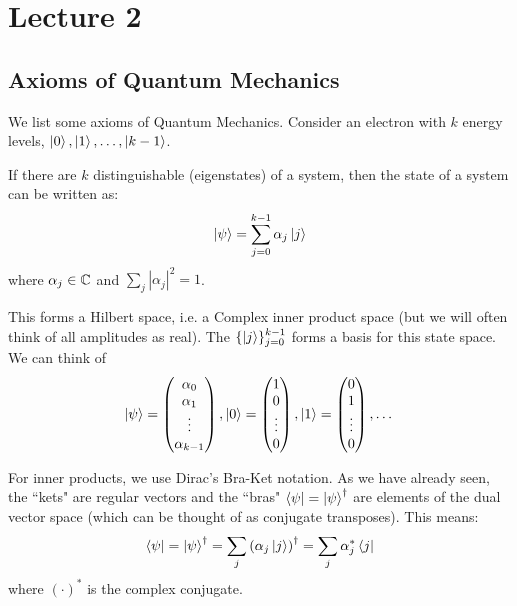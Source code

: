 
\section{Lecture 2}

\subsection{Axioms of Quantum Mechanics}

We list some axioms of Quantum Mechanics. Consider an electron with $k$ energy levels, $\ket{0}, \ket{1}, \dots, \ket{k - 1}$.

\begin{note}
    If there are $k$ distinguishable (eigenstates) of a system, then the state of a system can be written as:
    \[ \ket{\psi} = \sum_{j = 0}^{k - 1} \alpha_j \ket{j} \]
    where $\alpha_j \in \operatorname{\mathbb{C}}$ and $\sum_{j} |\alpha_j|^2 = 1$.
\end{note}

This forms a Hilbert space, i.e. a Complex inner product space (but we will often think of all amplitudes as real). The $\{ \ket{j} \}_{j = 0}^{k - 1}$ forms
a basis for this state space. We can think of
    \[ \ket{\psi} = \begin{pmatrix}
        \alpha_0 \\ \alpha_1 \\ \vdots \\ \alpha_{k - 1}
    \end{pmatrix}, \ket{0} = \begin{pmatrix}
        1 \\ 0 \\ \vdots \\ 0
    \end{pmatrix}, \ket{1} = \begin{pmatrix}
        0 \\ 1 \\ \vdots \\ 0
    \end{pmatrix}, \dots \]

For inner products, we use Dirac's Bra-Ket notation. As we have already seen, the ``kets" are regular vectors and the
``bras" $\bra{\psi} = \ket{\psi}^{\dagger}$ are elements of the dual vector space (which can be thought of as conjugate transposes). This means:
\[ \bra{\psi} = \ket{\psi}^{\dagger} = \sum_j \qty(\alpha_j \ket{j})^{\dagger} =  \sum_j \alpha_j^* \bra{j} \]
where $(\cdot)^*$ is the complex conjugate.

